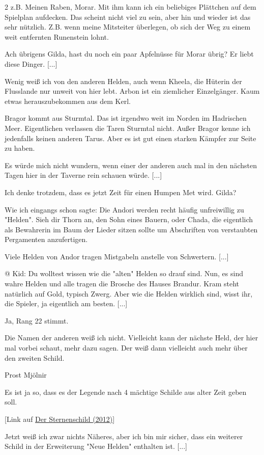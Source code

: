 \documentclass[10pt, a4paper, oneside]{book}
\begin{document}
\begin{multicols}{2}
z.B. Meinen Raben, Morar. Mit ihm kann ich ein beliebiges Plättchen auf dem Spielplan aufdecken. Das scheint nicht viel zu sein, aber hin und wieder ist das sehr nützlich. Z.B. wenn meine Mitsteiter überlegen, ob sich der Weg zu einem weit entfernten Runenstein lohnt.

Ach übrigens Gilda, hast du noch ein paar Apfelnüsse für Morar übrig? Er liebt diese Dinger. [...]

Wenig weiß ich von den anderen Helden, auch wenn Kheela, die Hüterin der Flusslande nur unweit von hier lebt. Arbon ist ein ziemlicher Einzelgänger. Kaum etwas herauszubekommen aus dem Kerl.

Bragor kommt aus Sturmtal. Das ist irgendwo weit im Norden im Hadrischen Meer. Eigentlichen verlassen die Taren Sturmtal nicht. Außer Bragor kenne ich jedenfalls keinen anderen Tarus. Aber es ist gut einen starken Kämpfer zur Seite zu haben.

Es würde mich nicht wundern, wenn einer der anderen auch mal in den nächsten Tagen hier in der Taverne rein schauen würde. [...]

Ich denke trotzdem, dass es jetzt Zeit für einen Humpen Met wird. Gilda?

Wie ich eingangs schon sagte: Die Andori werden recht häufig unfreiwillig zu "Helden". Sieh dir Thorn an, den Sohn eines Bauern, oder Chada, die eigentlich als Bewahrerin im Baum der Lieder sitzen sollte um Abschriften von verstaubten Pergamenten anzufertigen.

Viele Helden von Andor tragen Mistgabeln anstelle von Schwertern. [...]

@ Kid: Du wolltest wissen wie die "alten" Helden so drauf sind. Nun, es sind wahre Helden und alle tragen die Brosche des Hauses Brandur. Kram steht natürlich auf Gold, typisch Zwerg. Aber wie die Helden wirklich sind, wisst ihr, die Spieler, ja eigentlich am besten. [...]

Ja, Rang 22 stimmt.

Die Namen der anderen weiß ich nicht. Vielleicht kann der nächste Held, der hier mal vorbei schaut, mehr dazu sagen. Der weiß dann vielleicht auch mehr über den zweiten Schild.

Prost Mjölnir

Es ist ja so, dass es der Legende nach 4 mächtige Schilde aus alter Zeit geben soll.

[Link auf \hyperref[storytext-2012-der-sternenschild]{Der Sternenschild (2012)}]

Jetzt weiß ich zwar nichts Näheres, aber ich bin mir sicher, dass ein weiterer Schild in der Erweiterung "Neue Helden" enthalten ist. [...]


\end{multicols}
\end{document}
